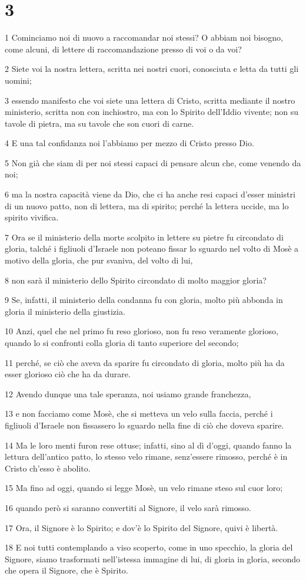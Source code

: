 \chapter{3}

\par 1 Cominciamo noi di nuovo a raccomandar noi stessi? O abbiam noi bisogno, come alcuni, di lettere di raccomandazione presso di voi o da voi?
\par 2 Siete voi la nostra lettera, scritta nei nostri cuori, conosciuta e letta da tutti gli uomini;
\par 3 essendo manifesto che voi siete una lettera di Cristo, scritta mediante il nostro ministerio, scritta non con inchiostro, ma con lo Spirito dell'Iddio vivente; non su tavole di pietra, ma su tavole che son cuori di carne.
\par 4 E una tal confidanza noi l'abbiamo per mezzo di Cristo presso Dio.
\par 5 Non già che siam di per noi stessi capaci di pensare alcun che, come venendo da noi;
\par 6 ma la nostra capacità viene da Dio, che ci ha anche resi capaci d'esser ministri di un nuovo patto, non di lettera, ma di spirito; perché la lettera uccide, ma lo spirito vivifica.
\par 7 Ora se il ministerio della morte scolpito in lettere su pietre fu circondato di gloria, talché i figliuoli d'Israele non poteano fissar lo sguardo nel volto di Mosè a motivo della gloria, che pur svaniva, del volto di lui,
\par 8 non sarà il ministerio dello Spirito circondato di molto maggior gloria?
\par 9 Se, infatti, il ministerio della condanna fu con gloria, molto più abbonda in gloria il ministerio della giustizia.
\par 10 Anzi, quel che nel primo fu reso glorioso, non fu reso veramente glorioso, quando lo si confronti colla gloria di tanto superiore del secondo;
\par 11 perché, se ciò che aveva da sparire fu circondato di gloria, molto più ha da esser glorioso ciò che ha da durare.
\par 12 Avendo dunque una tale speranza, noi usiamo grande franchezza,
\par 13 e non facciamo come Mosè, che si metteva un velo sulla faccia, perché i figliuoli d'Israele non fissassero lo sguardo nella fine di ciò che doveva sparire.
\par 14 Ma le loro menti furon rese ottuse; infatti, sino al dì d'oggi, quando fanno la lettura dell'antico patto, lo stesso velo rimane, senz'essere rimosso, perché è in Cristo ch'esso è abolito.
\par 15 Ma fino ad oggi, quando si legge Mosè, un velo rimane steso sul cuor loro;
\par 16 quando però si saranno convertiti al Signore, il velo sarà rimosso.
\par 17 Ora, il Signore è lo Spirito; e dov'è lo Spirito del Signore, quivi è libertà.
\par 18 E noi tutti contemplando a viso scoperto, come in uno specchio, la gloria del Signore, siamo trasformati nell'istessa immagine di lui, di gloria in gloria, secondo che opera il Signore, che è Spirito.

